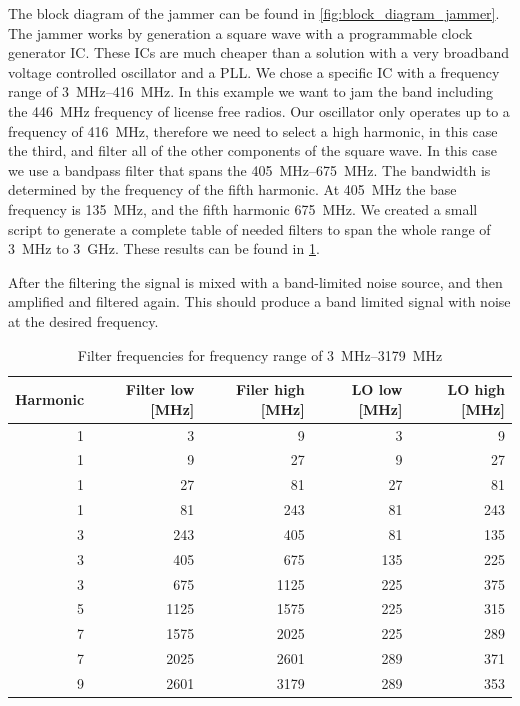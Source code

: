 \documentclass[a4paper, openany, oneside]{memoir}
\begin{document}
The block diagram of the jammer can be found in \cref{fig:block_diagram_jammer}. The jammer works by generation a square wave with a programmable clock generator IC. These ICs are much cheaper than a solution with a very broadband voltage controlled oscillator and a PLL. We chose a specific IC with a frequency range of \SIrange{3}{416}{\mega\hertz}. In this example we want to jam the band including the \SI{446}{\mega\hertz} frequency of license free radios. Our oscillator only operates up to a frequency of \SI{416}{\mega\hertz}, therefore we need to select a high harmonic, in this case the third, and filter all of the other components of the square wave. In this case we use a bandpass filter that spans the \SIrange{405}{675}{\mega\hertz}. The bandwidth is determined by the frequency of the fifth harmonic. At \SI{405}{\mega\hertz} the base frequency is \SI{135}{\mega\hertz}, and the fifth harmonic \SI{675}{\mega\hertz}. We created a small script to generate a complete table of needed filters to span the whole range of \SI{3}{\mega\hertz} to \SI{3}{\giga\hertz}. These results can be found in \cref{tab:filter_freqs}.

After the filtering the signal is mixed with a band-limited noise source, and then amplified and filtered again. This should produce a band limited signal with noise at the desired frequency.

\begin{table}[h]
\centering
\caption{Filter frequencies for frequency range of \SIrange{3}{3179}{\mega\hertz}}
\label{tab:filter_freqs}
\begin{adjustbox}{max width=\textwidth}
\begin{tabular}{rrrrr}
\toprule
   Harmonic &   Filter low [\si{\mega\hertz}] &   Filer high [\si{\mega\hertz}] &   LO low [\si{\mega\hertz}] &   LO high [\si{\mega\hertz}] \\
\midrule
          1 &            3 &            9 &        3 &         9 \\
          1 &            9 &           27 &        9 &        27 \\
          1 &           27 &           81 &       27 &        81 \\
          1 &           81 &          243 &       81 &       243 \\
          3 &          243 &          405 &       81 &       135 \\
          3 &          405 &          675 &      135 &       225 \\
          3 &          675 &         1125 &      225 &       375 \\
          5 &         1125 &         1575 &      225 &       315 \\
          7 &         1575 &         2025 &      225 &       289 \\
          7 &         2025 &         2601 &      289 &       371 \\
          9 &         2601 &         3179 &      289 &       353 \\
\bottomrule
\end{tabular}
\end{adjustbox}
\end{table}
\end{document}
